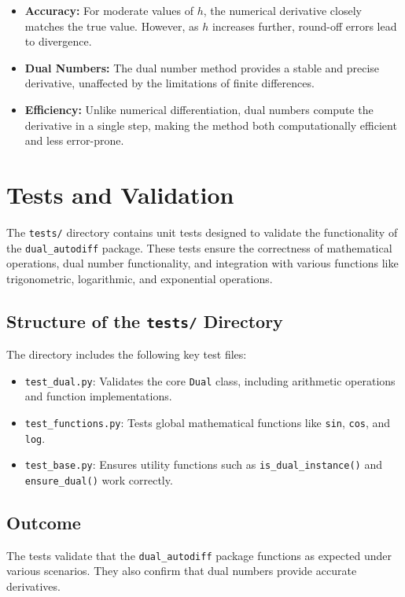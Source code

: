 \documentclass[a4paper,12pt]{article}
\begin{document}
\begin{itemize}
    \item \textbf{Accuracy:} For moderate values of \(h\), the numerical derivative closely matches the true value. However, as \(h\) increases further, round-off errors lead to divergence.
    \item \textbf{Dual Numbers:} The dual number method provides a stable and precise derivative, unaffected by the limitations of finite differences.
    \item \textbf{Efficiency:} Unlike numerical differentiation, dual numbers compute the derivative in a single step, making the method both computationally efficient and less error-prone.
\end{itemize}

\section{Tests and Validation}

The \texttt{tests/} directory contains unit tests designed to validate the functionality of the \texttt{dual\_autodiff} package. These tests ensure the correctness of mathematical operations, dual number functionality, and integration with various functions like trigonometric, logarithmic, and exponential operations.

\subsection{Structure of the \texttt{tests/} Directory}
The directory includes the following key test files:
\begin{itemize}
    \item \texttt{test\_dual.py}: Validates the core \texttt{Dual} class, including arithmetic operations and function implementations.
    \item \texttt{test\_functions.py}: Tests global mathematical functions like \texttt{sin}, \texttt{cos}, and \texttt{log}.
    \item \texttt{test\_base.py}: Ensures utility functions such as \texttt{is\_dual\_instance()} and \texttt{ensure\_dual()} work correctly.
\end{itemize}

\subsection{Outcome}
The tests validate that the \texttt{dual\_autodiff} package functions as expected under various scenarios. They also confirm that dual numbers provide accurate derivatives.
\end{document}
